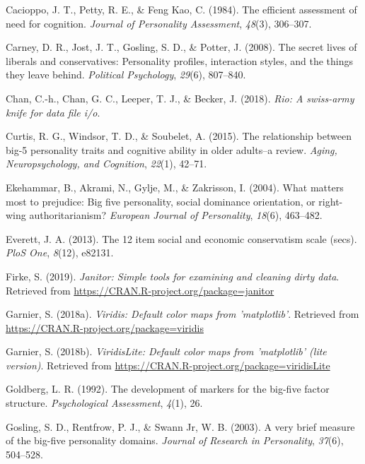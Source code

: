 \documentclass[man]{apa6}
\begin{document}
\hypertarget{ref-cacioppo1984efficient}{}
Cacioppo, J. T., Petty, R. E., \& Feng Kao, C. (1984). The efficient
assessment of need for cognition. \emph{Journal of Personality
Assessment}, \emph{48}(3), 306--307.

\hypertarget{ref-carney2008secret}{}
Carney, D. R., Jost, J. T., Gosling, S. D., \& Potter, J. (2008). The
secret lives of liberals and conservatives: Personality profiles,
interaction styles, and the things they leave behind. \emph{Political
Psychology}, \emph{29}(6), 807--840.

\hypertarget{ref-R-rio}{}
Chan, C.-h., Chan, G. C., Leeper, T. J., \& Becker, J. (2018).
\emph{Rio: A swiss-army knife for data file i/o}.

\hypertarget{ref-curtis2015relationship}{}
Curtis, R. G., Windsor, T. D., \& Soubelet, A. (2015). The relationship
between big-5 personality traits and cognitive ability in older
adults--a review. \emph{Aging, Neuropsychology, and Cognition},
\emph{22}(1), 42--71.

\hypertarget{ref-ekehammar2004matters}{}
Ekehammar, B., Akrami, N., Gylje, M., \& Zakrisson, I. (2004). What
matters most to prejudice: Big five personality, social dominance
orientation, or right-wing authoritarianism? \emph{European Journal of
Personality}, \emph{18}(6), 463--482.

\hypertarget{ref-everett201312}{}
Everett, J. A. (2013). The 12 item social and economic conservatism
scale (secs). \emph{PloS One}, \emph{8}(12), e82131.

\hypertarget{ref-R-janitor}{}
Firke, S. (2019). \emph{Janitor: Simple tools for examining and cleaning
dirty data}. Retrieved from
\url{https://CRAN.R-project.org/package=janitor}

\hypertarget{ref-R-viridis}{}
Garnier, S. (2018a). \emph{Viridis: Default color maps from
'matplotlib'}. Retrieved from
\url{https://CRAN.R-project.org/package=viridis}

\hypertarget{ref-R-viridisLite}{}
Garnier, S. (2018b). \emph{ViridisLite: Default color maps from
'matplotlib' (lite version)}. Retrieved from
\url{https://CRAN.R-project.org/package=viridisLite}

\hypertarget{ref-goldberg1992development}{}
Goldberg, L. R. (1992). The development of markers for the big-five
factor structure. \emph{Psychological Assessment}, \emph{4}(1), 26.

\hypertarget{ref-gosling2003very}{}
Gosling, S. D., Rentfrow, P. J., \& Swann Jr, W. B. (2003). A very brief
measure of the big-five personality domains. \emph{Journal of Research
in Personality}, \emph{37}(6), 504--528.
\end{document}
